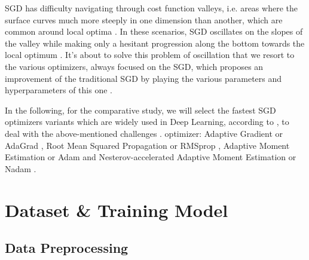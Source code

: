 \documentclass[lnbip]{svmultln}
\begin{document}
	SGD has difficulty navigating through cost function valleys, i.e. areas where the surface curves much more steeply in one dimension than another, which are common around local optima \cite[]{antoine2018apprentissage}. In these scenarios, SGD oscillates on the slopes of the valley while making only a hesitant progression along the bottom towards the local optimum \cite[]{ruder2016overview,bottou1991stochastic}.
	It's about to solve this problem of oscillation that we resort to the various optimizers, always focused on the SGD, which proposes an improvement of the traditional SGD by playing the various parameters and hyperparameters of this one \cite[]{lin2019nesterov,ruder2016overview}.
	
	
	In the following, for the comparative study, we will select the fastest SGD optimizers variants which are widely used in Deep Learning, according to \cite[]{geron2017hands, bottou2012stochastic}, to deal with the above-mentioned challenges \cite[]{ruder2016overview}. 
	optimizer: Adaptive Gradient or AdaGrad \cite[]{lydia2019adagrad}, Root Mean Squared Propagation or RMSprop \cite[]{geron2017hands}, Adaptive Moment Estimation or Adam \cite[]{kingma2014adam} and Nesterov-accelerated Adaptive Moment Estimation or Nadam \cite[]{lin2019nesterov,dozat2016incorporating}.


\section{Dataset \& Training Model }
\subsection{Data Preprocessing}
	
	
\end{document}
